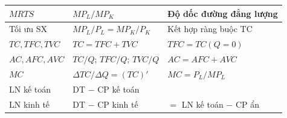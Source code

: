 \documentclass[a4paper,11pt]{article}
\begin{document}
\begin{center}
\begin{tabular}{|p{4cm}|p{5.5cm}|p{5.5cm}|}
$MRTS$ & $MP_L / MP_K$ & Độ dốc đường đẳng lượng\\
\hline
Tối ưu SX & $MP_L/P_L = MP_K/P_K$ & Kết hợp ràng buộc TC\\
\hline
$TC, TFC, TVC$ & $TC = TFC + TVC$ & $TFC = TC(Q=0)$\\
\hline
$AC, AFC, AVC$ & $TC/Q$; $TFC/Q$; $TVC/Q$ & $AC = AFC + AVC$\\
\hline
$MC$ & $\Delta TC / \Delta Q = (TC)'$ & $MC = P_L / MP_L$\\
\hline
LN kế toán & DT $-$ CP kế toán & \\
\hline
LN kinh tế & DT $-$ CP kinh tế & $= $ LN kế toán $-$ CP ẩn\\
\hline
\end{tabular}
\end{center}
\end{document}
